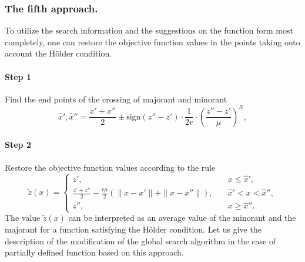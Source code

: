 \documentclass[runningheads]{llncs}
\begin{document}
\subsubsection{The fifth approach.} To utilize the search information and the suggestions on the function form most completely, one can restore the objective function values in the points taking onto account the H{\"o}lder condition.
\paragraph{Step 1} Find the end points of the crossing of majorant and minorant
\begin{equation}\label{eq18} 
\hat{x}',\hat{x}''=\frac {x'+x''}{2}\pm \text{sign}(z''-z')\cdot \frac {1}{2r} \cdot {\left(\frac {z''-z'}{\mu}\right)}^N,
\end{equation}
\paragraph{Step 2} Restore the objective function values according to the rule
\begin{equation}\label{eq19} 
\tilde{z}(x)=
  \begin{cases}
    z', & {\quad x \leq \hat{x}',}\\
    \frac {z'+z''}{2}- \frac {r \mu}{2} (\| x - x' \| + \| x - x'' \|), & {\quad \hat{x}' < x < \hat{x}'',}\\
    z'',  & {\quad x \geq \hat{x}''.}
  \end{cases}
\end{equation}
The value $\tilde{z}(x)$ can be interpreted as an average value of the minorant and the majorant for a function satisfying the H{\"o}lder condition. Let us give the description of the modification of the global search algorithm in the case of partially defined function based on this approach.
\end{document}
